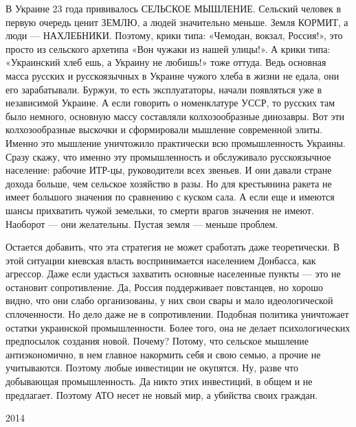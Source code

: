 В Украине 23 года прививалось СЕЛЬСКОЕ МЫШЛЕНИЕ. Сельский человек в первую
очередь ценит ЗЕМЛЮ, а людей значительно меньше. Земля КОРМИТ, а люди —
НАХЛЕБНИКИ. Поэтому, крики типа: «Чемодан, вокзал, Россия!», это просто из
сельского архетипа «Вон чужаки из нашей улицы!».  А крики типа: «Украинский
хлеб ешь, а Украину не любишь!» тоже оттуда. Ведь основная масса русских и
русскоязычных в Украине чужого хлеба в жизни не едала, они его зарабатывали.
Буржуи, то есть эксплуататоры, начали появляться уже в независимой Украине. А
если говорить о номенклатуре УССР, то русских там было немного, основную массу
составляли колхозообразные динозавры. Вот эти колхозообразные выскочки и
сформировали мышление современной элиты. Именно это мышление уничтожило
практически всю промышленность Украины. Сразу скажу, что именно эту
промышленность и обслуживало русскоязычное население: рабочие ИТР-цы,
руководители всех звеньев. И они давали стране дохода больше, чем сельское
хозяйство в разы. Но для крестьянина ракета не имеет большого значения по
сравнению с куском сала. А если еще и имеются шансы  прихватить чужой земельки,
то смерти врагов значения не имеют. Наоборот — они желательны. Пустая земля —
меньше проблем. 

Остается добавить, что эта стратегия не может сработать даже теоретически. В
этой ситуации киевская власть воспринимается населением Донбасса, как агрессор.
Даже если удасться захватить основные населенные пункты — это не остановит
сопротивление. Да, Россия поддерживает повстанцев, но хорошо видно, что они
слабо организованы, у них свои свары и мало идеологической сплоченности. Но
дело даже не в сопротивлении. Подобная политика уничтожает остатки украинской
промышленности. Более того, она не делает психологических предпосылок создания
новой. Почему? Потому, что сельское мышление антиэкономично, в нем главное
накормить себя и свою семью, а прочие не учитываются. Поэтому любые инвестиции
не окупятся. Ну, разве что добывающая промышленность. Да никто этих инвестиций,
в общем и не предлагает. Поэтому АТО несет не новый мир, а убийства своих
граждан.

2014
